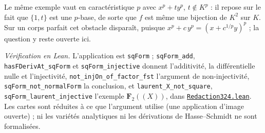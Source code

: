 Le même exemple vaut en caractéristique $p$ avec $x^p + t y^p$, $t \notin K^p$ : il repose sur le fait que $\{1, t\}$ est une $p$-base, de sorte que $f$ est même une bijection de $K^2$ sur $K$. Sur un corps parfait cet obstacle disparaît, puisque $x^p + c\,y^p = (x + c^{1/p} y)^p$ ; la question y reste ouverte ici.

\begin{sloppypar}
\noindent\emph{Vérification en Lean.} L'application est \texttt{sqForm} ; \texttt{sqForm\_add}, \texttt{hasFDerivAt\_sqForm} et \texttt{sqForm\_injective} donnent l'additivité, la différentielle nulle et l'injectivité, \texttt{not\_injOn\_of\_factor\_fst} l'argument de non-injectivité, \texttt{sqForm\_not\_normalForm} la conclusion, et \texttt{laurent\_X\_not\_square}, \texttt{sqForm\_laurent\_injective} l'exemple $\mathbf F_2(\!(X)\!)$, dans \href{\leanblobmain/Redaction324.lean}{\texttt{Redaction324.\allowbreak{}lean}}. Les cartes sont réduites à ce que l'argument utilise (une application d'image ouverte) ; ni les variétés analytiques ni les dérivations de Hasse--Schmidt ne sont formalisées.
\end{sloppypar}


